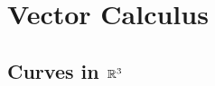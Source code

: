 \documentclass[main.tex]{subfiles}
\begin{document}
	\chapter{Vector Calculus}
			\section{Curves in $\mathbb R^3$}
			
\end{document}
